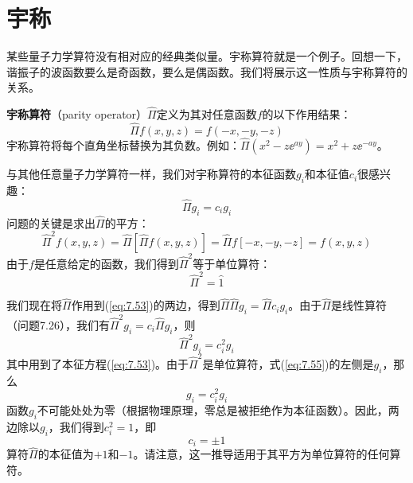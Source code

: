 \section{宇称}
\label{sec:7.5 Parity}
    某些量子力学算符没有相对应的经典类似量。宇称算符就是一个例子。回想一下，谐振子的波函数要么是奇函数，要么是偶函数。我们将展示这一性质与宇称算符的关系。

    \textbf{宇称算符}（parity operator）$\hat{\Pi}$定义为其对任意函数$f$的以下作用结果：
    \begin{equation}
        \boxed{
            \hat{\Pi}f\left(x,y,z\right) = f\left(-x,-y,-z\right)
        }
        \label{eq:7.52}
    \end{equation}
    宇称算符将每个直角坐标替换为其负数。例如：$\hat{\Pi}\left(x^2 - z\ee ^{ay}\right) = x^2 + z\ee ^{-ay}$。

    与其他任意量子力学算符一样，我们对宇称算符的本征函数$g_i$和本征值$c_i$很感兴趣：
    \begin{equation}
        \hat{\Pi}g_i = c_ig_i
        \label{eq:7.53}
    \end{equation}
    问题的关键是求出$\hat{\Pi}$的平方：
    \begin{equation*}
        \hat{\Pi}^2f\left(x,y,z\right) = \hat{\Pi}\left[\hat{\Pi}f\left(x,y,z\right)\right] = \hat{\Pi}f\left[-x,-y,-z\right] = f\left(x,y,z\right)
    \end{equation*}
    由于$f$是任意给定的函数，我们得到$\hat{\Pi}^2$等于单位算符：
    \begin{equation}
        \hat{\Pi}^2 = \hat{1}
        \label{eq:7.54}
    \end{equation}
    
    我们现在将$\hat{\Pi}$作用到(\ref{eq:7.53})的两边，得到$\hat{\Pi}\hat{\Pi}g_i = \hat{\Pi}c_ig_i$。由于$\hat{\Pi}$是线性算符（问题7.26），我们有$\hat{\Pi}^2g_i = c_i\hat{\Pi}g_i$，则
    \begin{equation}
        \hat{\Pi}^2g_i = c_i^2g_i
        \label{eq:7.55}
    \end{equation}
    其中用到了本征方程(\ref{eq:7.53})。由于$\hat{\Pi}^2$是单位算符，式(\ref{eq:7.55})的左侧是$g_i$，那么
    \begin{equation*}
        g_i = c_i^2g_i
    \end{equation*}
    函数$g_i$不可能处处为零（根据物理原理，零总是被拒绝作为本征函数）。因此，两边除以$g_i$，我们得到$c_i^2 = 1$，即
    \begin{equation}
        c_i = \pm 1
        \label{eq:7.56}
    \end{equation}
    算符$\hat{\Pi}$的本征值为$+1$和$-1$。请注意，这一推导适用于其平方为单位算符的任何算符。

